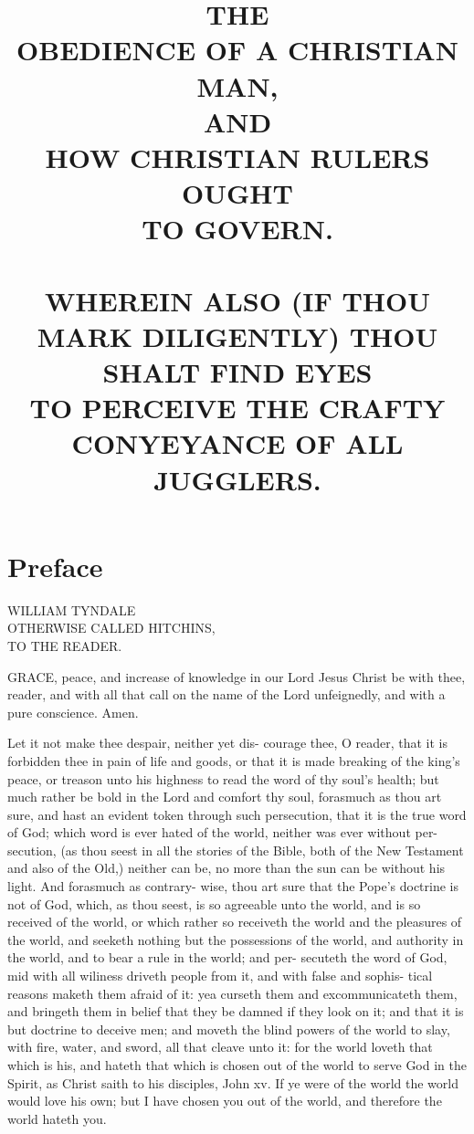 \documentclass{custom}
\begin{document}
\title{THE\\
OBEDIENCE OF A CHRISTIAN MAN,\\
AND\\
HOW CHRISTIAN RULERS OUGHT\\
TO GOVERN.\\
\\
WHEREIN ALSO (IF THOU MARK DILIGENTLY) THOU SHALT FIND EYES\\
TO PERCEIVE THE CRAFTY CONYEYANCE OF ALL JUGGLERS.}
\author{}
\date{}
\maketitle

\section*{Preface}
\begin{center}
WILLIAM TYNDALE\\
OTHERWISE CALLED HITCHINS,\\
TO THE READER. 
\end{center}

GRACE, peace, and increase of knowledge in 
our Lord Jesus Christ be with thee, reader, 
and with all that call on the name of the Lord 
unfeignedly, and with a pure conscience. Amen. 

Let it not make thee despair, neither yet dis- 
courage thee, O reader, that it is forbidden thee 
in pain of life and goods, or that it is made 
breaking of the king's peace, or treason unto his
highness to read the word of thy soul's health;
but much rather be bold in the Lord and comfort
thy soul, forasmuch as thou art sure, and hast an 
evident token through such persecution, that it is 
the true word of God; which word is ever hated 
of the world, neither was ever without per- 
secution, (as thou seest in all the stories of the 
Bible, both of the New Testament and also of the 
Old,) neither can be, no more than the sun can be
without his light. And forasmuch as contrary-
wise, thou art sure that the Pope's doctrine is
not of God, which, as thou seest, is so agreeable 
unto the world, and is so received of the world, 
or which rather so receiveth the world and the 
pleasures of the world, and seeketh nothing but 
the possessions of the world, and authority in the 
world, and to bear a rule in the world; and per- 
secuteth the word of God, mid with all wiliness 
driveth people from it, and with false and sophis- 
tical reasons maketh them afraid of it: yea curseth 
them and excommunicateth them, and bringeth 
them in belief that they be damned if they look 
on it; and that it is but doctrine to deceive men; 
and moveth the blind powers of the world to 
slay, with fire, water, and sword, all that cleave 
unto it: for the world loveth that which is his, 
and hateth that which is chosen out of the world 
to serve God in the Spirit, as Christ saith to his 
disciples, John xv. If ye were of the world the 
world would love his own; but I have chosen you 
out of the world, and therefore the world hateth 
you. 
\end{document}
